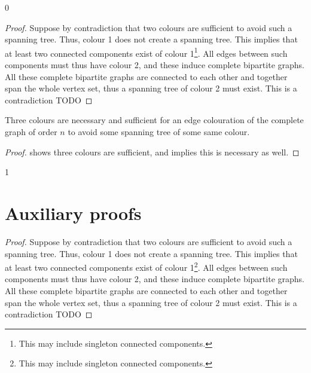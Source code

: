 \documentclass[a4paper,USenglish]{lipics-v2021}
\newcommand{\moveToAppendix}{1}
\begin{document}
\newcommand{\starTheoremTwoProof}{
\begin{proof}
	Suppose by contradiction that two colours are sufficient to avoid such a spanning tree.
	Thus, colour 1 does not create a spanning tree. This implies that at least two connected components exist of colour 1\footnote{This may include singleton connected components.}. All edges between such components must thus have colour 2, and these induce complete bipartite graphs. All these complete bipartite graphs are connected to each other and together span the whole vertex set, thus a spanning tree of colour 2 must exist. This is a contradiction TODO
\end{proof}
}\if\moveToAppendix0\starTheoremTwoProof\fi

\begin{corollary}
	Three colours are necessary and sufficient for an edge colouration of the complete graph of order $n$ to avoid some spanning tree of some same colour.
\end{corollary}

\begin{proof}
	 shows three colours are sufficient, and  implies this is necessary as well.
\end{proof}
	
\if\moveToAppendix1 
\newpage
\appendix	
\section{Auxiliary proofs}
\label{appendix:aux}

\starTheoremTwo*
\starTheoremTwoProof

\fi
		
\end{document}
